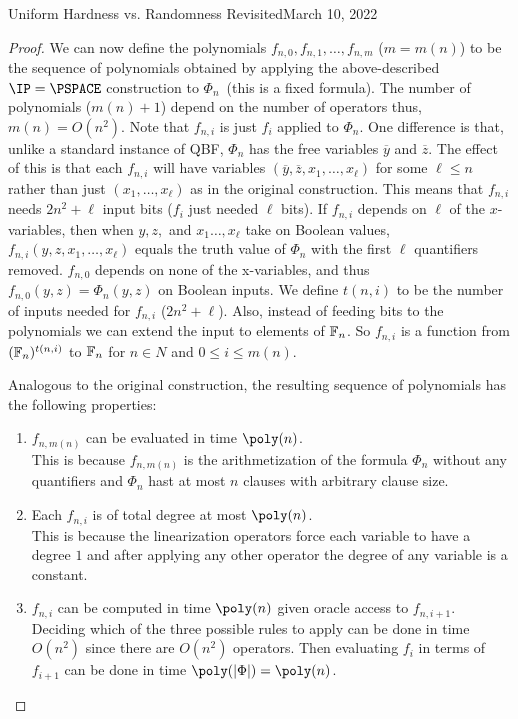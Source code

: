 \begin{lecture}{8}{Uniform Hardness vs. Randomness Revisited}{March 10, 2022}
\begin{proof}
We can now define the polynomials $f_{n,0}, f_{n,1},\ldots , f_{n,m}$ ($m = m(n)$) to be the sequence of polynomials obtained by applying the above-described $\IP = \PSPACE$ construction to $\Phi_n$~(this is a fixed formula). The number of polynomials ($m(n)+1$) depend on the number of operators thus, $m(n)=O(n^2)$. 
Note that $f_{n,i}$ is just $f_i$ applied to $\Phi_n$. 
One difference is that, unlike a standard instance of QBF, $\Phi_n$ has the free variables $\overline{y}$ and $\overline{z}$. The effect of this is that each $f_{n,i}$ will have variables $(\overline{y}, \overline{z}, x_1,\ldots, x_{\ell})$ for some $\ell \leq n$ rather than just $(x_1, \ldots , x_{\ell})$ as in the original construction. This means that $f_{n,i}$ needs $2n^2 + \ell$ input bits ($f_i$ just needed $\ell$ bits). 
If $f_{n,i}$ depends on $\ell$ of the $x$-variables, then when $y, z,$ and $x_1 \ldots , x_{\ell}$ take on Boolean values, $f_{n,i}(y, z, x_1, \ldots , x_{\ell})$ equals the truth value of $\Phi_n$ with the first $\ell$ quantifiers removed. $f_{n,0}$ depends on none of the x-variables, and thus $f_{n,0}(y, z) = \Phi_n(y, z)$ on Boolean inputs. We define $t(n,i)$ to be the number of inputs needed for $f_{n,i}$ ($2n^2+\ell$). Also, instead of feeding bits to the polynomials we can extend the input to elements of $\mathbb{F}_n$. So $f_{n,i}$ is a function from $(\mathbb{F}_n)^{t(n,i)}$ to $\mathbb{F}_n$ for $n \in N$ and $0 \leq i \leq m(n)$.

Analogous to the original construction, the resulting sequence of polynomials has the following properties:
\begin{enumerate}
	\item $f_{n,m(n)}$ can be evaluated in time $\poly(n)$. \\
	This is because $f_{n,m(n)}$ is the arithmetization of the formula $\Phi_n$ without any quantifiers and $\Phi_n$ hast at most $n$ clauses with arbitrary clause size. 
	
	\item Each $f_{n,i}$ is of total degree at most $\poly(n)$. \\
	This is because the linearization operators force each variable to have a degree $1$ and after applying any other operator the degree of any variable is a constant.
	
	\item $f_{n,i}$ can be computed in time $\poly(n)$ given oracle access to $f_{n,i+1}$. \\
	Deciding which of the three possible rules to apply can be done in time $O(n^2)$ since there are $O(n^2)$ operators. Then evaluating $f_i$ in terms of $f_{i+1}$ can be done in time $\poly(\card{\Phi}) = \poly(n)$.
\end{enumerate}


\end{proof}
\end{lecture}
